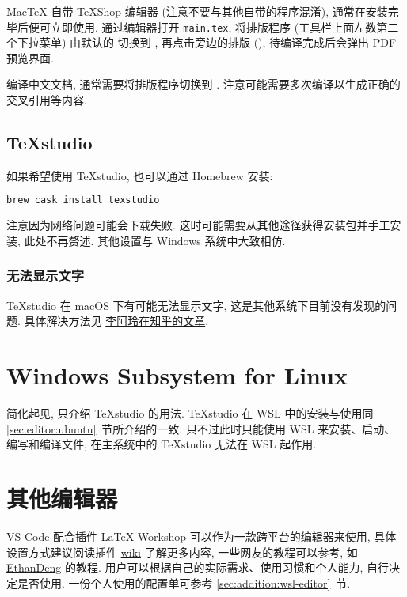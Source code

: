 Mac\TeX{} 自带 \TeX Shop 编辑器 (注意不要与其他自带的程序混淆),
通常在安装完毕后便可立即使用.
通过编辑器打开 \texttt{main.tex},
将排版程序 (工具栏上面左数第二个下拉菜单) 由默认的  切换到
,
再点击旁边的排版  (),
待编译完成后会弹出 PDF 预览界面.

编译中文文档, 通常需要将排版程序切换到 .
注意可能需要多次编译以生成正确的交叉引用等内容.

\subsection{\TeX studio}

如果希望使用 \TeX studio, 也可以通过 Homebrew 安装:
\begin{lstlisting}[language=bash]
  brew cask install texstudio
\end{lstlisting}
注意因为网络问题可能会下载失败.
这时可能需要从其他途径获得安装包并手工安装, 此处不再赘述.
其他设置与 Windows 系统中大致相仿.

\subsubsection{无法显示文字}

\TeX studio 在 macOS 下有可能无法显示文字,
这是其他系统下目前没有发现的问题.
具体解决方法见%
\href{https://zhuanlan.zhihu.com/p/80728204}{李阿玲在知乎的文章}.

\section{Windows Subsystem for Linux}\label{sec:editor:wsl}

简化起见,
只介绍 \TeX studio 的用法.
\TeX studio 在 WSL 中的安装与使用同 \ref{sec:editor:ubuntu}~节所介绍的一致.
只不过此时只能使用 WSL 来安装、启动、编写和编译文件,
在主系统中的 \TeX studio 无法在 WSL 起作用.

\section{其他编辑器}

\href{https://code.visualstudio.com/}{VS Code}
配合插件
\href{https://marketplace.visualstudio.com/items?itemName=James-Yu.latex-workshop}{LaTeX Workshop}
可以作为一款跨平台的编辑器来使用,
具体设置方式建议阅读插件
\href{https://github.com/James-Yu/LaTeX-Workshop/wiki}{wiki}
了解更多内容,
一些网友的教程可以参考,
如
\href{https://github.com/EthanDeng/vscode-latex}{EthanDeng}
的教程.
用户可以根据自己的实际需求、使用习惯和个人能力,
自行决定是否使用.
一份个人使用的配置单可参考 \ref{sec:addition:wsl-editor}~节.

